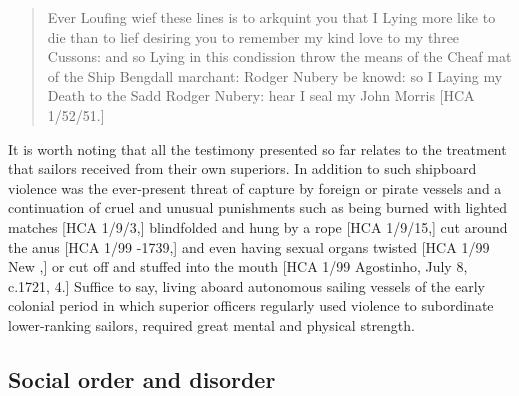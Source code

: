 \begin{quotation}
Ever Loufing wief these lines is to arkquint you that I Lying more like to die than to lief desiring you to remember my kind love to my three Cussons: and so Lying in this condission throw the means of the Cheaf mat of the Ship Bengdall marchant: Rodger Nubery be knowd: so I Laying my Death to the Sadd Rodger Nubery: hear I seal my John Morris [HCA 1/52/51.] \end{quotation}

It is worth noting that all the testimony presented so far relates to the treatment that sailors received from their own superiors. In addition to such shipboard violence was the ever-present threat of capture by foreign or pirate vessels and a continuation of cruel and unusual punishments such as being burned with lighted matches [HCA 1/9/3,] blindfolded and hung by a rope [HCA 1/9/15,] cut around the anus [HCA 1/99 \citealt{Jamaica1738}-1739,] and even having sexual organs twisted [HCA 1/99 New \citealt{Providence1722},] or cut off and stuffed into the mouth [HCA 1/99 Agostinho, July 8, c.1721, 4.] Suffice to say, living aboard autonomous sailing vessels of the early colonial period in which superior officers regularly used violence to subordinate lower-ranking sailors, required great mental and physical strength.

\subsection{\textbf{Social} \textbf{order} \textbf{and} \textbf{disorder}}%


